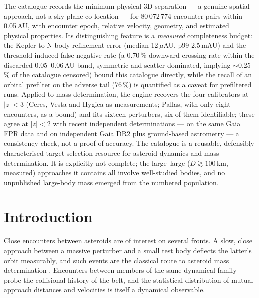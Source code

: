\documentclass{aa}
\begin{document}
{The catalogue records the minimum physical 3D separation --- a genuine spatial
approach, not a sky-plane co-location --- for 80\,072\,774 encounter pairs within
0.05\,AU, with encounter epoch, relative velocity, geometry, and estimated
physical properties. Its distinguishing feature is a \emph{measured}
completeness budget: the Kepler-to-N-body refinement error (median
12\,$\mu$AU, p99 2.5\,mAU) and the threshold-induced false-negative rate
(a 0.70\,\% downward-crossing rate within the discarded 0.05--0.06\,AU band,
symmetric and scatter-dominated, implying $\sim$0.25\,\% of the catalogue
censored) bound this catalogue directly, while
the recall of an orbital prefilter on the adverse tail (76\,\%) is quantified as a
caveat for prefiltered runs. Applied to mass determination, the
engine recovers the four calibrators at $|z|<3$ (Ceres, Vesta and Hygiea as
measurements; Pallas, with only eight encounters, as a bound) and fits sixteen
perturbers, six of them identifiable; these agree at $|z|<2$ with recent
independent determinations --- \citet{fuentesmunoz2025} on the same Gaia FPR
data and \citet{siltala2022} on independent Gaia DR2 plus ground-based
astrometry --- a consistency check, not a proof of accuracy.}
{The catalogue is a reusable, defensibly characterised target-selection
resource for asteroid dynamics and mass determination. It is explicitly not
complete; the large--large ($D\gtrsim100$\,km, measured) approaches it contains
all involve well-studied bodies, and no unpublished large-body mass emerged from
the numbered population.}


\maketitle

\section{Introduction}
\label{sec:intro}

Close encounters between asteroids are of interest on several fronts. A slow,
close approach between a massive perturber and a small test body deflects the
latter's orbit measurably, and such events are the classical route to asteroid
mass determination \citep{michalak2000, fienga2003, goffin2014, baer2017,
siltala2020, li2023, fuentesmunoz2025}. Encounters between members of the same
dynamical family probe the collisional history of the belt, and the statistical
distribution of mutual approach distances and velocities is itself a dynamical
observable.
\end{document}
